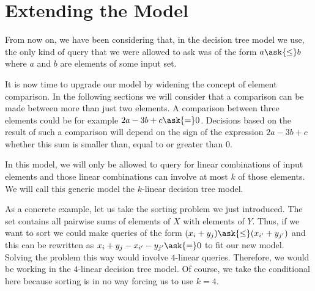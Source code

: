 \section{Extending the Model}

From now on, we have been considering that, in the decision tree
model we use, the only kind of query that we were allowed to ask was of the
form \(a \ask{\le} b \) where \(a\) and \(b\) are elements of some input set.

It is now time to upgrade our model by widening the concept of element
comparison. In the following sections we will consider that a comparison can
be made between more than just two elements. A comparison between three
elements could be for example \(2a - 3b + c \ask{=} 0\). Decisions based on the
result of such a comparison will depend on the sign of the expression
\(2a - 3b + c\) \ie whether this sum is smaller than, equal to or greater than
\(0\).

In this model, we will only be allowed to query for linear combinations of
input elements and those linear combinations can involve at most \(k\) of those
elements. We will call this generic model the \(k\)-linear decision tree model.

As a concrete example, let us take the sorting \XY problem we just introduced.
The set \XY contains all pairwise sums of elements of \(X\) with elements of
\(Y\). Thus, if we want to sort \XY we could make queries of the form \((x_i +
y_j) \ask{\le} (x_{i'} + y_{j'})\) and this can be rewritten as \( x_i +
y_j - x_{i'} - y_{j'} \ask{=} 0\) to fit our new model. Solving the problem
this way would involve \(4\)-linear queries. Therefore, we would be working in
the \(4\)-linear decision tree model. Of course, we take the conditional here
because sorting \XY is in no way forcing us to use \(k=4\).
